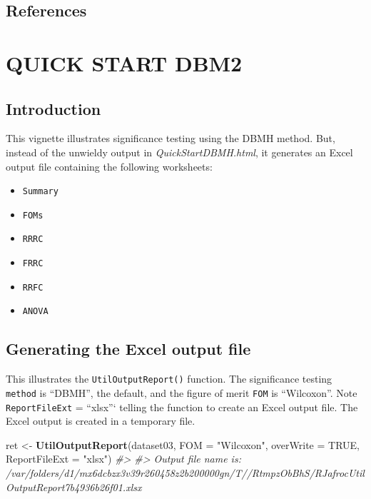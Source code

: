 \documentclass[]{book}
\newenvironment{Shaded}{\begin{snugshade}}{\end{snugshade}}
\newcommand{\CommentTok}[1]{\textcolor[rgb]{0.56,0.35,0.01}{\textit{#1}}}
\newcommand{\DataTypeTok}[1]{\textcolor[rgb]{0.13,0.29,0.53}{#1}}
\newcommand{\KeywordTok}[1]{\textcolor[rgb]{0.13,0.29,0.53}{\textbf{#1}}}
\newcommand{\NormalTok}[1]{#1}
\newcommand{\OtherTok}[1]{\textcolor[rgb]{0.56,0.35,0.01}{#1}}
\newcommand{\StringTok}[1]{\textcolor[rgb]{0.31,0.60,0.02}{#1}}
\providecommand{\tightlist}{%
  \setlength{\itemsep}{0pt}\setlength{\parskip}{0pt}}
\begin{document}
\hypertarget{references-5}{%
\section{References}\label{references-5}}

\hypertarget{QuickStartDBM2}{%
\chapter{QUICK START DBM2}\label{QuickStartDBM2}}

\hypertarget{introduction-5}{%
\section{Introduction}\label{introduction-5}}

This vignette illustrates significance testing using the DBMH method. But, instead of the unwieldy output in \emph{QuickStartDBMH.html}, it generates an Excel output file containing the following worksheets:

\begin{itemize}
\tightlist
\item
  \texttt{Summary}
\item
  \texttt{FOMs}
\item
  \texttt{RRRC}
\item
  \texttt{FRRC}
\item
  \texttt{RRFC}
\item
  \texttt{ANOVA}
\end{itemize}

\hypertarget{generating-the-excel-output-file}{%
\section{Generating the Excel output file}\label{generating-the-excel-output-file}}

This illustrates the \texttt{UtilOutputReport()} function. The significance testing \texttt{method} is ``DBMH'', the default, and the figure of merit \texttt{FOM} is ``Wilcoxon''. Note \texttt{ReportFileExt} = ``xlsx''` telling
the function to create an Excel output file. The Excel output is created in a temporary file.

\begin{Shaded}
\begin{Highlighting}[]
\NormalTok{ret <-}\StringTok{ }\KeywordTok{UtilOutputReport}\NormalTok{(dataset03, }\DataTypeTok{FOM =} \StringTok{"Wilcoxon"}\NormalTok{, }\DataTypeTok{overWrite =} \OtherTok{TRUE}\NormalTok{, }\DataTypeTok{ReportFileExt =} \StringTok{"xlsx"}\NormalTok{)}
\CommentTok{#> }
\CommentTok{#> Output file name is:      /var/folders/d1/mx6dcbzx3v39r260458z2b200000gn/T//RtmpzObBhS/RJafrocUtilOutputReport7b4936b26f01.xlsx}
\end{Highlighting}
\end{Shaded}
\end{document}
